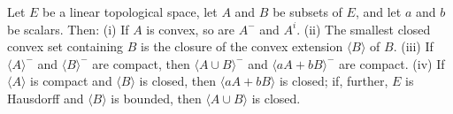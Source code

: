 Let $E$ be a linear topological space, let $A$ and $B$ be subsets of $E$, and let $a$ and $b$ be scalars. Then:
(i) If $A$ is convex, so are $A^{-}$ and $A^{i}$.
(ii) The smallest closed convex set containing $B$ is the closure of the convex extension $\langle B \rangle$ of $B$.
(iii) If $\langle A \rangle^{-}$ and $\langle B \rangle^{-}$ are compact, then $\langle A \cup B \rangle^{-}$ and $\langle aA + bB \rangle^{-}$ are compact.
(iv) If $\langle A \rangle$ is compact and $\langle B \rangle$ is closed, then $\langle aA + bB \rangle$ is closed; if, further, $E$ is Hausdorff and $\langle B \rangle$ is bounded, then $\langle A \cup B \rangle$ is closed.
